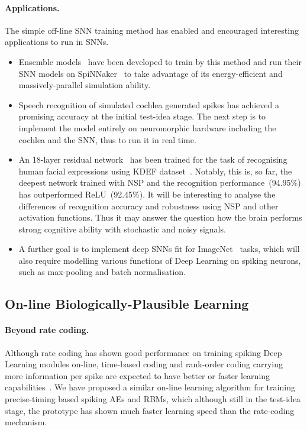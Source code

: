 \paragraph{Applications.}
The simple off-line SNN training method has enabled and encouraged interesting applications to run in SNNs.

\begin{itemize}
	\item Ensemble models~\citep{rokach2010ensemble} have been developed to train by this method and run their SNN models on SpiNNaker~\citep{furber2014spinnaker} to take advantage of its energy-efficient and massively-parallel simulation ability.
	\item Speech recognition of simulated cochlea generated spikes has achieved a promising accuracy at the initial test-idea stage.
	The next step is to implement the model entirely on neuromorphic hardware including the cochlea and the SNN, thus to run it in real time.
	\item An 18-layer residual network~\citep{he2016deep} has been trained for the task of recognising human facial expressions using KDEF dataset~\citep{lundqvist1998karolinska}.
	Notably, this is, so far, the deepest network trained with NSP and the recognition performance~(94.95\%) has outperformed ReLU~(92.45\%).
	It will be interesting to analyse the differences of recognition accuracy and robustness using NSP and other activation functions.
	Thus it may answer the question how the brain performs strong cognitive ability with stochastic and noisy signals.
 	\item A further goal is to implement deep SNNs fit for ImageNet~\citep{deng2009imagenet} tasks, which will also require modelling various functions of Deep Learning on spiking neurons, such as max-pooling and batch normalisation. 

\end{itemize}


\subsection{On-line Biologically-Plausible Learning}
\paragraph{Beyond rate coding.}
Although rate coding has shown good performance on training spiking Deep Learning modules on-line, time-based coding and rank-order coding carrying more information per spike are expected to have better or faster learning capabilities~\citep{gautrais1998rate}.
We have proposed a similar on-line learning algorithm for training precise-timing based spiking AEs and RBMs, which although still in the test-idea stage, the prototype has shown much faster learning speed than the rate-coding mechanism.

